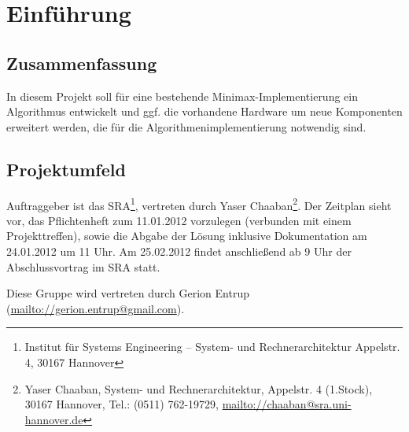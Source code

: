 \chapter{Einführung}
\label{chapter:Pflichtenheft-Einfuehrung}

\section{Zusammenfassung}
\label{section:Pflichtenheft-Einfuehrung-Zusammenfassung}

In diesem Projekt soll für eine bestehende Minimax-Implementierung ein Algorithmus entwickelt und ggf. die vorhandene Hardware um neue Komponenten erweitert werden, die für die Algorithmenimplementierung notwendig sind.

\section{Projektumfeld}
\label{section:Pflichtenheft-Einfuehrung-Projektumfeld}

Auftraggeber ist das SRA\footnote{Institut für Systems Engineering -- System- und Rechnerarchitektur Appelstr. 4, 30167 Hannover}, vertreten durch Yaser Chaaban\footnote{Yaser Chaaban, System- und Rechnerarchitektur, Appelstr. 4 (1.Stock), 30167 Hannover, Tel.: (0511) 762-19729, \url{mailto://chaaban@sra.uni-hannover.de}}. Der Zeitplan sieht vor, das Pflichtenheft zum 11.01.2012 vorzulegen (verbunden mit einem Projekttreffen), sowie die Abgabe der Lösung inklusive Dokumentation am 24.01.2012 um 11 Uhr. Am 25.02.2012 findet anschließend ab 9 Uhr der Abschlussvortrag im SRA statt.

Diese Gruppe wird vertreten durch Gerion Entrup (\url{mailto://gerion.entrup@gmail.com}).
